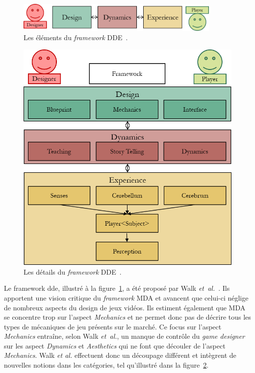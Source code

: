 \begin{figure}
    \begin{center}
    \includegraphics[width=10cm]{10_img/chap3/dde.png} 
    \caption{Les \'el\'ements du \emph{framework} DDE~\cite{DDE}.}
    \label{fig.dde}
    \end{center}
\end{figure}

\begin{figure}
    \begin{center}
    \includegraphics[width=13cm]{10_img/chap3/dde_extended_modif.png} 
    \caption{Les d\'etails du \emph{framework} DDE~\cite{DDE}.}
    \label{fig.dde_extended}
    \end{center}
\end{figure}

Le framework \gls{dde}, illustr\'e \`a la figure~\ref{fig.dde}, a \'et\'e propos\'e par Walk \emph{et~al.}~\cite{DDE}. 
Ils apportent une vision critique du \emph{framework} MDA et avancent que celui-ci néglige de nombreux aspects du design de jeux vidéos. 
Ils estiment également que MDA se concentre trop sur l'aspect \emph{Mechanics} et ne permet donc pas de décrire tous les types de mécaniques de jeu présents sur le marché. 
Ce focus sur l'aspect \emph{Mechanics} entraîne, selon Walk \emph{et~al.}, un manque de contrôle du \emph{game designer} sur les aspect \emph{Dynamics} et \emph{Aesthetics} qui ne font que découler de l'aspect \emph{Mechanics}. 
%
Walk \emph{et al.} effectuent donc un découpage différent et intègrent de nouvelles notions dans les catégories, tel qu'illustr\'e dans la figure~\ref{fig.dde_extended}.




